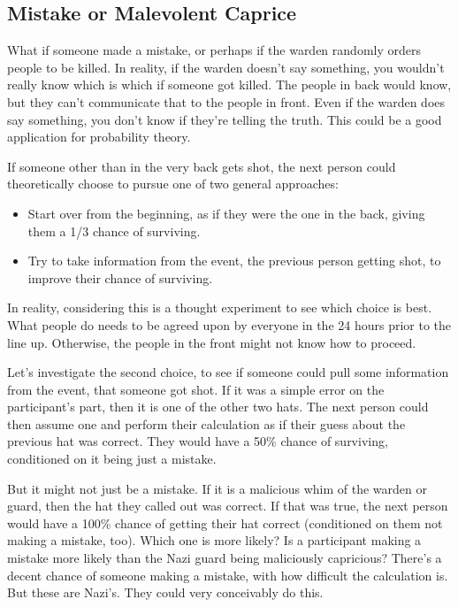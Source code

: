 \documentclass[10pt]{article}
\begin{document}
\subsection{Mistake or Malevolent Caprice}

What if someone made a mistake, or perhaps if the warden randomly orders 
people to be killed. In reality, if the warden doesn't say something, 
you wouldn't really know which is which if someone got killed. The people in 
back would know, but they can't communicate that to the people in front. 
Even if the warden does say something, you don't know if they're telling 
the truth. This could be a good application for probability theory.

If someone other than in the very back gets shot, the next person could 
theoretically choose to pursue one of two general approaches:
\begin{itemize}
    \item Start over from the beginning, as if they were the one in the 
    back, giving them a 1/3 chance of surviving.
    \item Try to take information from the event, the previous person 
    getting shot, to improve their chance of surviving.
\end{itemize}
In reality, considering this is a thought experiment to see 
which choice is best. What people do 
needs to be agreed upon by everyone in the 24 hours prior to the line up. 
Otherwise, the people in the front might not know how to proceed.

Let's investigate the second choice, to see if someone could pull 
some information from the event, that someone got shot. 
If it was a simple error on the participant's part, then it is one of 
the other two hats. The next person could then assume one and perform 
their calculation as if their guess about the previous hat was correct. 
They would have a 50\% chance of surviving, conditioned on it being 
just a mistake. 

But it might not just be a mistake. If it is a malicious whim of the warden 
or guard, then the hat they called out was correct. If that was true, 
the next person would have a 100\% chance of getting their hat correct 
(conditioned on them not making a mistake, too). Which one is more 
likely? Is a participant making a mistake more likely than the Nazi guard 
being maliciously capricious? There's a decent chance of someone making 
a mistake, with how difficult the calculation is. But these are Nazi's. 
They could very conceivably do this. 
\end{document}
